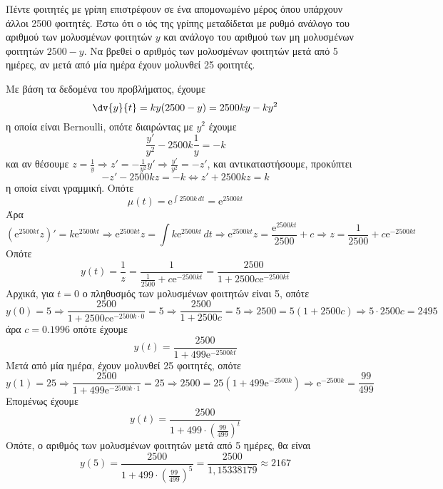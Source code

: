 \begin{myboxs1}
\begin{problem}
  Πέντε φοιτητές με γρίπη επιστρέφουν σε ένα απομονωμένο μέρος όπου υπάρχουν άλλοι 
  2500 φοιτητές. Έστω ότι ο ιός της γρίπης μεταδίδεται με ρυθμό ανάλογο του αριθμού των 
  μολυσμένων φοιτητών $y$ και ανάλογο του αριθμού των μη μολυσμένων φοιτητών $ 2500-y $.
  Να βρεθεί ο αριθμός των μολυσμένων φοιτητών μετά από 5 ημέρες, αν μετά από μία 
  ημέρα έχουν μολυνθεί 25 φοιτητές.
\end{problem}
\end{myboxs1}
\begin{solution}
  Με βάση τα δεδομένα του προβλήματος, έχουμε 
  \[
    \dv{y}{t} = ky(2500-y) = 2500ky - ky^{2}
  \] 
  η οποία είναι Bernoulli, οπότε διαιρώντας με $ y^{2} $ έχουμε
  \[
    \frac{y'}{y^{2}} -2500k \frac{1}{y} = -k
  \] 
  και αν θέσουμε $ z = \frac{1}{y} \Rightarrow z' = - \frac{1}{y^{2}}y' \Rightarrow
  \frac{y'}{y^{2}} = -z' $, και αντικαταστήσουμε, προκύπτει
  \[
    -z'-2500kz=-k \Leftrightarrow z' + 2500kz = k
  \]
  η οποία είναι γραμμική. Οπότε
  \[
    \mu (t) = \mathrm{e}^{\int 2500k \,{dt}} = \mathrm{e}^{2500kt} 
  \] 
  Άρα 
  \[
    \left(\mathrm{e}^{2500kt} z\right)' = k \mathrm{e}^{2500kt} \Rightarrow 
    \mathrm{e}^{2500kt} z = \int k \mathrm{e}^{2500kt} \,{dt} \Rightarrow 
    \mathrm{e}^{2500kt} z = \frac{\mathrm{e}^{2500kt}}{2500} + c \Rightarrow 
    z = \frac{1}{2500} + c \mathrm{e}^{-2500kt}
  \] 
  Οπότε
  \[
    y(t) = \frac{1}{z} = \frac{1}{\frac{1}{2500} + c \mathrm{e}^{-2500kt}} =
    \frac{2500}{1 + 2500c \mathrm{e}^{-2500kt}} 
  \]
  Αρχικά, για $ t=0 $ ο πληθυσμός των μολυσμένων φοιτητών είναι 5, οπότε
  \[
    y(0)= 5 \Rightarrow  \frac{2500}{1 + 2500c \mathrm{e}^{-2500k\cdot 0}} = 
    5 \Rightarrow \frac{2500}{1 + 2500c} = 5 \Rightarrow 2500 = 5(1+2500c) 
    \Rightarrow 5\cdot 2500 c = 2495 
  \] 
  άρα $c = 0.1996$ οπότε έχουμε
  \[
    y(t) = \frac{2500}{1 + 499 \mathrm{e}^{-2500kt}} 
  \] 
  Μετά από μία ημέρα, έχουν μολυνθεί 25 φοιτητές, οπότε
  \[
    y(1)=25 \Rightarrow \frac{2500}{1 + 499\mathrm{e}^{-2500k \cdot 1}} = 25
    \Rightarrow 2500 = 25 \left(1+ 499\mathrm{e}^{-2500k}\right) 
    \Rightarrow \mathrm{e}^{-2500k} = \frac{99}{499} 
  \] 
  Επομένως έχουμε
  \[
    y(t) = \frac{2500}{1+ 499\cdot \left(\frac{99}{499}\right)^{t}}
  \] 
  Οπότε, ο αριθμός των μολυσμένων φοιτητών μετά από 5 ημέρες, θα είναι
  \[
    y(5) = \frac{2500}{1+ 499\cdot \left(\frac{99}{499}\right)^{5}} =
    \frac{2500}{1,15338179} \approx 2167 
  \] 
\end{solution}

